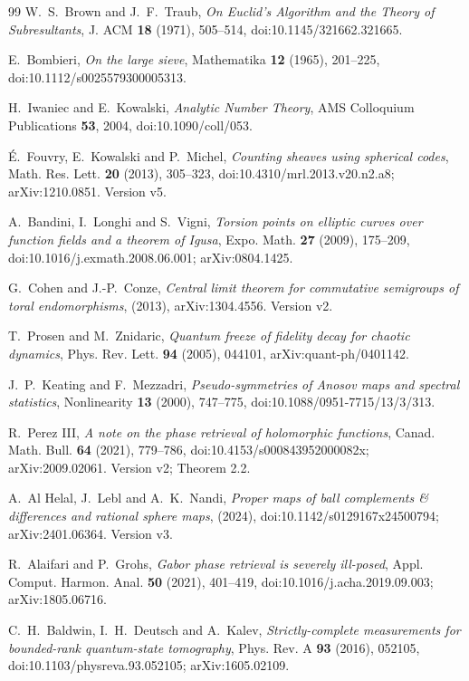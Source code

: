 \begin{thebibliography}{99}
W.~S.~Brown and J.~F.~Traub,
\emph{On Euclid's Algorithm and the Theory of Subresultants},
J. ACM \textbf{18} (1971), 505--514,
doi:10.1145/321662.321665.

E.~Bombieri,
\emph{On the large sieve},
Mathematika \textbf{12} (1965), 201--225,
doi:10.1112/s0025579300005313.

H.~Iwaniec and E.~Kowalski,
\emph{Analytic Number Theory},
AMS Colloquium Publications \textbf{53}, 2004,
doi:10.1090/coll/053.

\'E.~Fouvry, E.~Kowalski and P.~Michel,
\emph{Counting sheaves using spherical codes},
Math. Res. Lett. \textbf{20} (2013), 305--323,
doi:10.4310/mrl.2013.v20.n2.a8; arXiv:1210.0851.
Version v5.

A.~Bandini, I.~Longhi and S.~Vigni,
\emph{Torsion points on elliptic curves over function fields and a theorem of Igusa},
Expo. Math. \textbf{27} (2009), 175--209,
doi:10.1016/j.exmath.2008.06.001; arXiv:0804.1425.

G.~Cohen and J.-P.~Conze,
\emph{Central limit theorem for commutative semigroups of toral endomorphisms},
(2013),
arXiv:1304.4556.
Version v2.

T.~Prosen and M.~Znidaric,
\emph{Quantum freeze of fidelity decay for chaotic dynamics},
Phys. Rev. Lett. \textbf{94} (2005), 044101,
arXiv:quant-ph/0401142.

J.~P.~Keating and F.~Mezzadri,
\emph{Pseudo-symmetries of Anosov maps and spectral statistics},
Nonlinearity \textbf{13} (2000), 747--775,
doi:10.1088/0951-7715/13/3/313.

R.~Perez III,
\emph{A note on the phase retrieval of holomorphic functions},
Canad. Math. Bull. \textbf{64} (2021), 779--786,
doi:10.4153/s000843952000082x; arXiv:2009.02061.
Version v2; Theorem 2.2.

A.~Al Helal, J.~Lebl and A.~K.~Nandi,
\emph{Proper maps of ball complements \& differences and rational sphere maps},
(2024),
doi:10.1142/s0129167x24500794; arXiv:2401.06364.
Version v3.

R.~Alaifari and P.~Grohs,
\emph{Gabor phase retrieval is severely ill-posed},
Appl. Comput. Harmon. Anal. \textbf{50} (2021), 401--419,
doi:10.1016/j.acha.2019.09.003; arXiv:1805.06716.

C.~H.~Baldwin, I.~H.~Deutsch and A.~Kalev,
\emph{Strictly-complete measurements for bounded-rank quantum-state tomography},
Phys. Rev. A \textbf{93} (2016), 052105,
doi:10.1103/physreva.93.052105; arXiv:1605.02109.


\end{thebibliography}
